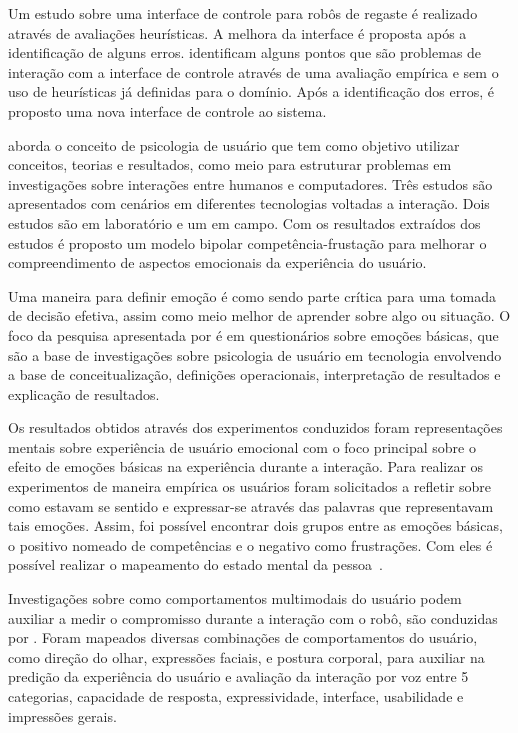 Um estudo sobre uma interface de controle para robôs de regaste é realizado através de avaliações heurísticas. A melhora da interface é proposta após a identificação de alguns erros.  identificam alguns pontos que são problemas de interação com a interface de controle através de uma avaliação empírica e sem o uso de heurísticas já definidas para o domínio. Após a identificação dos erros, é proposto uma nova interface de controle ao sistema.

 aborda o conceito de psicologia de usuário que tem como objetivo utilizar conceitos, teorias e resultados, como meio para estruturar problemas em investigações sobre interações entre humanos e computadores. Três estudos são apresentados com cenários em diferentes tecnologias voltadas a interação. Dois estudos são em laboratório e um em campo. Com os resultados extraídos dos estudos é proposto um modelo bipolar competência-frustação para melhorar o compreendimento de aspectos emocionais da experiência do usuário.

Uma maneira para definir emoção é como sendo parte crítica para uma tomada de decisão efetiva, assim como meio melhor de aprender sobre algo ou situação. O foco da pesquisa apresentada por  é em questionários sobre emoções básicas, que são a base de investigações sobre psicologia de usuário em tecnologia envolvendo a base de conceitualização, definições operacionais, interpretação de resultados e explicação de resultados.

Os resultados obtidos através dos experimentos conduzidos foram representações mentais sobre experiência de usuário emocional com o foco principal sobre o efeito de emoções básicas na experiência durante a interação. Para realizar os experimentos de maneira empírica os usuários foram solicitados a refletir sobre como estavam se sentido e expressar-se através das palavras que representavam tais emoções. Assim, foi possível encontrar dois grupos entre as emoções básicas, o positivo nomeado de competências e o negativo como frustrações. Com eles é possível realizar o mapeamento do estado mental da pessoa~\cite{saariluoma:2014}.

Investigações sobre como comportamentos multimodais do usuário podem auxiliar a medir o compromisso durante a interação com o robô, são conduzidas por . Foram mapeados diversas combinações de comportamentos do usuário, como direção do olhar, expressões faciais, e postura corporal, para auxiliar na predição da experiência do usuário e avaliação da interação por voz entre 5 categorias, capacidade de resposta, expressividade, interface, usabilidade e impressões gerais.

